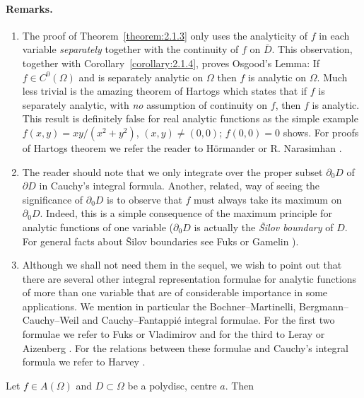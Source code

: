 \paragraph*{Remarks.}
\begin{enumerate}
\item The proof of Theorem~\ref{theorem:2.1.3} only uses the analyticity of $f$ in each variable \emph{separately} together with the continuity of $f$ on $\bar D$. This observation, together with Corollary~\ref{corollary:2.1.4}, proves Osgood's Lemma: If $f\in C^0(\Omega)$ and is separately analytic on $\Omega$ then $f$ is analytic on $\Omega$. Much less trivial is the amazing theorem of Hartogs which states that if $f$ is
separately analytic, with \emph{no} assumption of continuity on $f$, then $f$ is analytic. This result is definitely false for real analytic functions as the simple example $f(x,y)=xy/(x^2+y^2)$, $(x,y)\neq(0,0)$; $f(0,0)=0$ shows. For proofs of Hartogs theorem we refer the reader to H\"ormander \cite{bib:I:hormander-l:1} or R. Narasimhan \cite{bib:I:narasimhan-r:2}.
\item The reader should note that we only integrate over the proper subset $\partial_0D$ of $\partial D$ in Cauchy's integral formula. Another, related, way of seeing the significance of $\partial_0D$ is to observe that $f$ must always take its maximum on $\partial_0D$. Indeed, this is a simple consequence of the maximum principle for analytic functions of one variable ($\partial_0D$ is actually the \emph{\v Silov boundary} of $D$. For general facts about \v Silov boundaries see Fuks \cite{bib:I:fuks-b-a:1} or Gamelin \cite{bib:I:gamelin-t-w:1}).
\item Although we shall not need them in the sequel, we wish to point out that there are several other integral representation formulae for analytic functions of more than one variable that are of considerable importance in some applications. We mention in particular the Bochner--Martinelli, Bergmann--Cauchy--Weil and Cauchy--Fantappi\'e integral formulae. For the first two formulae we refer to Fuks \cite{bib:I:fuks-b-a:2} or Vladimirov \cite{bib:I:vladimirov-v-s:1} and for the third to Leray \cite{bib:I:leray-j:1} or Aizenberg \cite{bib:I:aizenberg-l-a:1}. For the relations between these formulae and Cauchy's integral formula we refer to Harvey \cite{bib:I:harvey-f-r:1}.
\end{enumerate}
 Let $f\in A(\Omega)$ and $D\subset\Omega$ be a polydisc, centre $a$. Then
